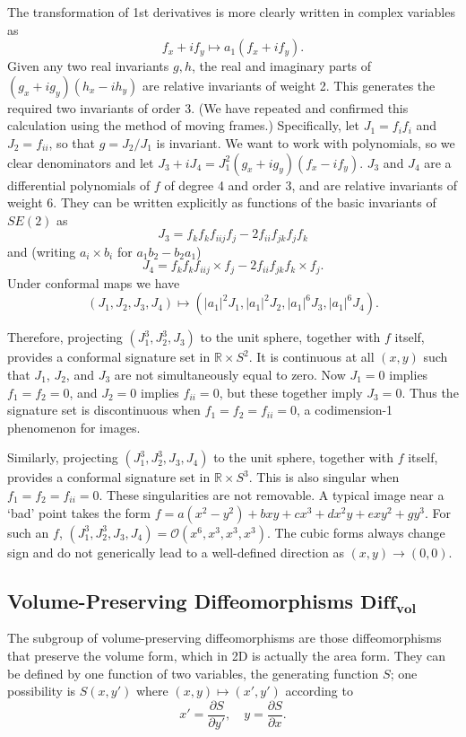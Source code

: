 \documentclass[review,onefignum,onetabnum]{siamonline190516}
\def\R{\mathbb{R}}
\begin{document}
The transformation of 1st derivatives is more clearly written in complex variables as $$ f_x + i f_y \mapsto a_1 (f_x + i f_y).$$ Given any two real invariants $g,h$, the real and imaginary parts of $(g_x+i g_y)(h_x-i h_y)$ are relative invariants of weight 2. This generates the required two invariants of order 3. (We have repeated and confirmed this calculation using the method of moving frames.) Specifically, let $J_1 = f_i f_i$ and  $J_2 = f_{ii}$, so that  $g = J_2/J_1$ is invariant.  We want to work with polynomials, so we clear denominators and let $J_3+iJ_4 = J_1^2 (g_x + i g_y)  (f_x - i f_y)$. $J_3$ and $J_4$ are a differential polynomials of $f$ of degree 4 and order 3, and are relative invariants of weight 6. They can be written explicitly as functions of the basic invariants of $SE(2)$ as
$$J_3 = f_k f_k f_{iij}f_j - 2 f_{ii} f_{jk} f_j f_k$$
and (writing $a_i\times b_i$ for $a_1 b_2 - b_2 a_1$)
$$ J_4 = f_k f_k f_{iij}\times f_j - 2 f_{ii} f_{jk} f_k\times f_j.$$
Under conformal maps we have
$$ (J_1,J_2,J_3,J_4) \mapsto (|a_1|^2 J_1, |a_1|^2 J_2, |a_1|^6 J_3,|a_1|^6 J_4).$$

Therefore, projecting $(J_1^3,J_2^3,J_3)$ to the unit sphere, together with $f$ itself, provides a conformal signature set in $\R\times S^2$. It is continuous at all $(x,y)$ such that $J_1$, $J_2$, and $J_3$ are not simultaneously equal to zero.  Now $J_1=0$ implies $f_1=f_2=0$, and $J_2=0$ implies $f_{ii}=0$, but these together imply $J_3=0$. Thus the signature set is discontinuous when $f_1=f_2=f_{ii}=0$, a codimension-1 phenomenon for images.

Similarly, projecting $(J_1^3,J_2^3,J_3,J_4)$ to the unit sphere, together with $f$ itself, provides a conformal signature set in $\R\times S^3$. This is also singular when $f_1=f_2=f_{ii}=0$. These singularities are not removable. A typical image near a `bad' point takes the form $f = a(x^2-y^2) + b x y + c x^3 + d x^2 y + e x y^2 + g y^3$.  For such an $f$, $(J_1^3,J_2^3,J_3,J_4)=\mathcal{O}(x^6,x^3,x^3,x^3)$.  The cubic forms always change sign and do not generically lead to a well-defined direction as $(x,y)\to(0,0)$. 

\subsection{Volume-Preserving Diffeomorphisms $\mathbf{Diff_{vol}}$}

The subgroup of volume-preserving diffeomorphisms are those diffeomorphisms that preserve the volume form, which in 2D is actually the area form. They can be defined by one function of two variables, the generating function $S$; one possibility is $S(x,y')$ where $(x,y)\mapsto(x',y')$ according to
$$ x'=\frac{\partial S}{\partial y'},\quad y = \frac{\partial S}{\partial x}.$$
\end{document}
